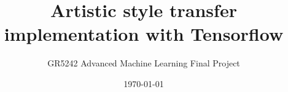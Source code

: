 \documentclass[letterpaper,12pt, oneside]{layout}
\title{Artistic style transfer implementation with Tensorflow}
\subtitle{GR5242 Advanced Machine Learning Final Project}
\date{\today}
\begin{document}
\cleardoublepage
\maketitle

\frontmatter



\tableofcontents


\mainmatter





\appendix
\renewcommand\theequation{\Alph{chapter}--\arabic{equation}}
\renewcommand\thefigure{\Alph{chapter}--\arabic{figure}}
\renewcommand\thetable{\Alph{chapter}--\arabic{table}}




\backmatter



\end{document}
